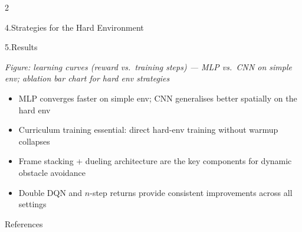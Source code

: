 \documentclass[final]{beamer}
\newcommand{\figplaceholder}[2][5.5cm]{%
  \begin{center}
    \colorbox{gray!12}{%
      \parbox[c][#1][c]{0.92\linewidth}{%
        \centering\color{gray!55}\large\itshape #2%
      }%
    }
  \end{center}
}
\begin{document}
\begin{frame}[t]
\begin{multicols}{2}
\begin{alertblock}{4.\enspace Strategies for the Hard Environment}
\end{alertblock}


\begin{block}{5.\enspace Results}

\figplaceholder[8cm]{Figure: learning curves (reward vs.\ training steps) --- MLP vs.\ CNN on simple env; ablation bar chart for hard env strategies}

\begin{itemize}
  \item MLP converges faster on simple env; CNN generalises better spatially on the hard env
  \item Curriculum training essential: direct hard-env training without warmup collapses
  \item Frame stacking + dueling architecture are the key components for dynamic obstacle avoidance
  \item Double DQN and $n$-step returns provide consistent improvements across all settings
\end{itemize}

\end{block}


\begin{block}{References}
{\tiny\printbibliography[heading=none]}
\end{block}


\end{multicols}
\end{frame}
\end{document}
